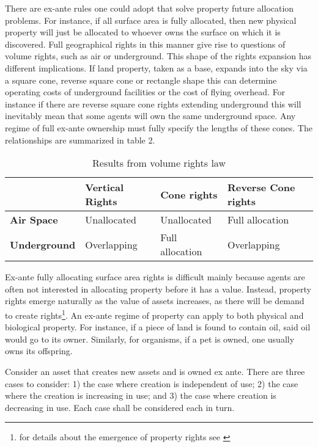 There are ex-ante rules one could adopt that solve property future allocation problems. For instance, if all surface area is fully allocated, then new physical property will just be allocated to whoever owns the surface on which it is discovered. Full geographical rights in this manner give rise to questions of volume rights, such as air or underground. This shape of the rights expansion has different implications. If land property, taken as a base, expands into the sky via a square cone, reverse square cone or rectangle shape this can determine operating costs of underground facilities or the cost of flying overhead. For instance if there are reverse square cone rights extending underground this will inevitably mean that some agents will own the same underground space. Any regime of full ex-ante ownership must fully specify the lengths of these cones. The relationships are summarized in table 2.

\begin{table}[h]
\begin{tabular}{|l|l|l|l|}
\hline
                     & \textbf{Vertical Rights}       & \textbf{Cone rights}          & \textbf{Reverse Cone rights}  \\ \hline
\textbf{Air Space}   & Unallocated             & Unallocated            & Full allocation \\ \hline
\textbf{Underground} & Overlapping & Full allocation & Overlapping       \\ \hline
\end{tabular}
\caption{Results from volume rights law}
\label{Volume}
\end{table}

Ex-ante fully allocating surface area rights is difficult mainly because agents are often not interested in allocating property before it has a value. Instead, property rights emerge naturally as the value of assets increases, as there will be demand to create rights\footnote{for details about the emergence of property rights see \cite{Alchian1973}}. An ex-ante regime of property can apply to both physical and biological property. For instance, if a piece of land is found to contain oil, said oil would go to its owner. Similarly, for organisms, if a pet is owned, one usually owns its offspring.

Consider an asset that creates new assets and is owned ex ante. There are three cases to consider: 1) the case where creation is independent of use; 2) the case where the creation is increasing in use; and 3) the case where creation is decreasing in use. Each case shall be considered each in turn. 

